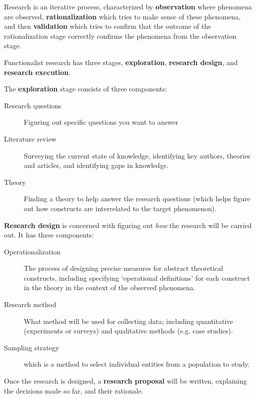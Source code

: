 Research is an iterative process, characterized by
\textbf{observation} where phenomena are observed,
\textbf{rationalization} which tries to make sense of these phenomena,
and then \textbf{validation} which tries to confirm that the outcome
of the rationalization stage correctly confirms the phenomena from the
observation stage.

Functionalist research has three stages, \textbf{exploration},
\textbf{research design}, and \textbf{research execution}.

The \textbf{exploration} stage consists of three components:
\begin{adjustwidth}{0.5cm}{}
\begin{description}
  \item[Research questions] Figuring out specific questions you want to
    answer
  \item[Literature review] Surveying the current state of knowledge,
    identifying key authors, theories and articles, and identifying
    gaps in knowledge.
  \item[Theory] Finding a theory to help answer the research questions
    (which helps figure out how constructs are interrelated to the
    target phenomenon).
\end{description}
\end{adjustwidth}

\textbf{Research design} is concerned with figuring out \textit{how}
the research will be carried out. It has three components:
\begin{adjustwidth}{0.5cm}{}
\begin{description}
  \item[Operationalization] The process of designing precise measures
    for abstract theoretical constructs, including specifying
    `operational definitions' for each construct in the theory in the
    context of the observed phenomena.
  \item[Research method] What method will be used for collecting data;
    including quantitative (experiments or surveys) and qualitative
    methods (e.g. case studies).
  \item[Sampling strategy] which is a method to select individual
    entities from a population to study.
\end{description}
\end{adjustwidth}

Once the research is designed, a \textbf{research proposal} will be
written, explaining the decisions made so far, and their rationale.

